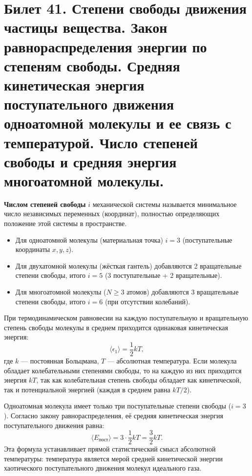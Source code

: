 \section{Билет 41. Степени свободы движения частицы вещества. Закон равнораспределения энергии по степеням свободы. Средняя кинетическая энергия поступательного движения одноатомной молекулы и ее связь с температурой. Число степеней свободы и средняя энергия многоатомной молекулы.}

\begin{definition}
\textbf{Числом степеней свободы} $i$ механической системы называется минимальное число независимых переменных (координат), полностью определяющих положение этой системы в пространстве.
\begin{itemize}
    \item Для одноатомной молекулы (материальная точка) $i = 3$ (поступательные координаты $x, y, z$).
    \item Для двухатомной молекулы (жёсткая гантель) добавляются 2 вращательные степени свободы, итого $i = 5$ (3 поступательные + 2 вращательные).
    \item Для многоатомной молекулы ($N \ge 3$ атомов) добавляются 3 вращательные степени свободы, итого $i = 6$ (при отсутствии колебаний).
\end{itemize}
\end{definition}

\begin{theorem}
При термодинамическом равновесии на каждую поступательную и вращательную степень свободы молекулы в среднем приходится одинаковая кинетическая энергия:
\begin{equation}
    \langle \epsilon_{1} \rangle = \frac{1}{2} k T, \label{eq:equipart_41}
\end{equation}
где $k$ --- постоянная Больцмана, $T$ --- абсолютная температура.
Если молекула обладает колебательными степенями свободы, то на каждую из них приходится энергия $kT$, так как колебательная степень свободы обладает как кинетической, так и потенциальной энергией (каждая в среднем равна $kT/2$).
\end{theorem}

\begin{property}
Одноатомная молекула имеет только три поступательные степени свободы ($i=3$). Согласно закону равнораспределения, её средняя кинетическая энергия поступательного движения равна:
\begin{equation}
    \langle E_{\text{пост}} \rangle = 3 \cdot \frac{1}{2} k T = \frac{3}{2} k T. \label{eq:mono_energy_41}
\end{equation}
Эта формула устанавливает прямой статистический смысл абсолютной температуры: температура является мерой средней кинетической энергии хаотического поступательного движения молекул идеального газа.
\end{property}

